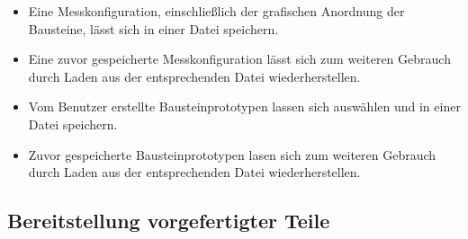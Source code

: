 \documentclass[parskip=full]{scrartcl}
\begin{document}
\begin{itemize}
		
	\item 
	\begin{MussKrit} 			
		Eine Messkonfiguration, einschließlich der grafischen Anordnung der Bausteine, lässt sich in einer Datei speichern.
	\end{MussKrit}
	
	\item 
	\begin{MussKrit} 			
		Eine zuvor gespeicherte Messkonfiguration lässt sich zum weiteren Gebrauch durch Laden aus der entsprechenden Datei wiederherstellen. 
	\end{MussKrit}
	
	\item 
	\begin{SollKrit} 
		Vom Benutzer erstellte Bausteinprototypen lassen sich auswählen und in einer Datei speichern.			
	\end{SollKrit}
	
	\item 
	\begin{SollKrit} 			
		Zuvor gespeicherte Bausteinprototypen lasen sich zum weiteren Gebrauch durch Laden aus der entsprechenden Datei wiederherstellen. 
	\end{SollKrit}
	
\end{itemize}

\subsection {Bereitstellung vorgefertigter Teile}
\end{document}
